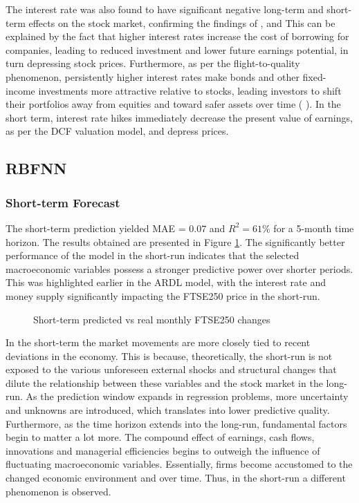 \documentclass[11pt,a4paper]{article}
\newcommand{\citeboth}[1]{\citeauthor{#1} \citep{#1}}
\begin{document}
The interest rate was also found to have significant negative long-term and short-term effects on the stock market, confirming the findings of \citeboth{alam2009}, \citeboth{demir2019} and \citeboth{neifar2023}
This can be explained by the fact that higher interest 
rates increase the cost of borrowing for companies, leading to reduced investment 
and lower future earnings potential, in turn depressing stock prices. 
Furthermore, as per the flight-to-quality phenomenon, persistently higher interest rates make bonds and other fixed-income 
investments more attractive relative to stocks, leading investors to shift 
their portfolios away from equities and toward safer assets over time (\citeboth{asgharian2016}). 
In the short term, interest rate hikes immediately decrease the present value of earnings, as per the 
DCF valuation model, and depress prices.




\subsection{RBFNN}

\subsubsection{Short-term Forecast}


The short-term prediction yielded MAE = $0.07$ and 
$R^2 = 61\%$ for a 5-month time horizon. The results obtained are presented in Figure \ref{fig:shortmonthly}.
The significantly better performance of the model in the short-run
indicates that the selected macroeconomic variables possess
a stronger predictive power over shorter periods. This was highlighted 
earlier in the ARDL model, with the interest rate and money supply significantly
impacting the FTSE250 price in the short-run.



\begin{figure}[H]
    \centering
    \hspace*{-1.5cm}
      
    \caption{Short-term predicted vs real monthly FTSE250 changes}
    \label{fig:shortmonthly}
\end{figure}



In the short-term the market movements
are more closely tied to recent deviations in the economy. This is because,
theoretically, 
the short-run is not exposed to the various unforeseen external shocks and structural changes
that dilute the relationship between these variables and the stock market in the 
long-run. As the prediction window expands in regression problems, 
more uncertainty and unknowns are introduced, which translates into 
lower predictive quality. Furthermore, as the time horizon extends into the long-run, fundamental factors 
begin to matter a lot more. The compound effect of earnings, cash flows,
innovations and managerial efficiencies begins to outweigh the 
influence of fluctuating macroeconomic variables. Essentially, firms become accustomed 
to the changed economic environment and over time. Thus, in the short-run 
a different phenomenon is observed.
\end{document}
